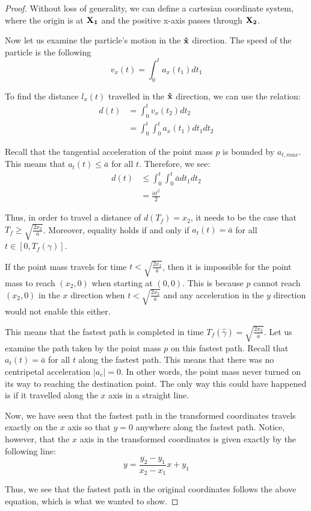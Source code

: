 \begin{proof} 

Without loss of generality, we can define a cartesian coordinate system, where the origin is at $\mathbf{X_1}$ and the positive x-axis passes through $\mathbf{X_2}$.

Now let us examine the particle's motion in the $\mathbf{\hat{x}}$ direction. The speed of the particle is the following
\begin{equation}
  v_x(t) = \int_0^t a_x(t_1) dt_1
\end{equation}

To find the distance $l_x(t)$ travelled in the $\mathbf{\hat{x}}$ direction, we can use the relation:
\begin{align}
  d(t) &= \int_0^t v_x(t_2) dt_2 \\
  &= \int_0^t \int_0^t a_x(t_1) dt_1 dt_2
\end{align}

Recall that the tangential acceleration of the point mass $p$ is bounded by $a_{t,max}$. This means that $a_t(t) \leq \bar{a}$ for all $t$. Therefore, we see:
\begin{align}
  d(t) &\leq \int_0^t \int_0^t \bar{a} dt_1 dt_2\\
  &= \frac{\bar{a} t^2}{2}
\end{align}

Thus, in order to travel a distance of $d(T_f) = x_2$, it needs to be the case that $T_f \geq \sqrt{\frac{2 x_2}{\bar{a}}}$. Moreover, equality holds if and only if $a_t(t) = \bar{a}$ for all $t \in [0, T_f(\gamma)]$.

If the point mass travels for time $t < \sqrt{\frac{2 x_2}{\bar{a}}}$, then it is impossible for the point mass to reach $(x_2, 0)$ when starting at $(0,0)$. This is because $p$ cannot reach $(x_2, 0)$ in the $x$ direction when $t < \sqrt{\frac{2 x_2}{\bar{a}}}$ and any acceleration in the $y$ direction would not enable this either.

This means that the fastest path is completed in time $T_f(\hat{\gamma}) = \sqrt{\frac{2 x_2}{\bar{a}}}$. Let us examine the path taken by the point mass $p$ on this fastest path. Recall that $a_t(t) = \bar{a}$ for all $t$ along the fastest path. This means that there was no centripetal acceleration $|a_c| = 0$. In other words, the point mass never turned on its way to reaching the destination point. The only way this could have happened is if it travelled along the $x$ axis in a straight line.

Now, we have seen that the fastest path in the transformed coordinates travels exactly on the $x$ axis so that $y = 0$ anywhere along the fastest path. Notice, however, that the $x$ axis in the transformed coordinates is given exactly by the following line:
\begin{equation}
  y = \frac{y_2 - y_1}{x_2 - x_1} x + y_1
\end{equation}

Thus, we see that the fastest path in the original coordinates follows the above equation, which is what we wanted to show.
\end{proof}

